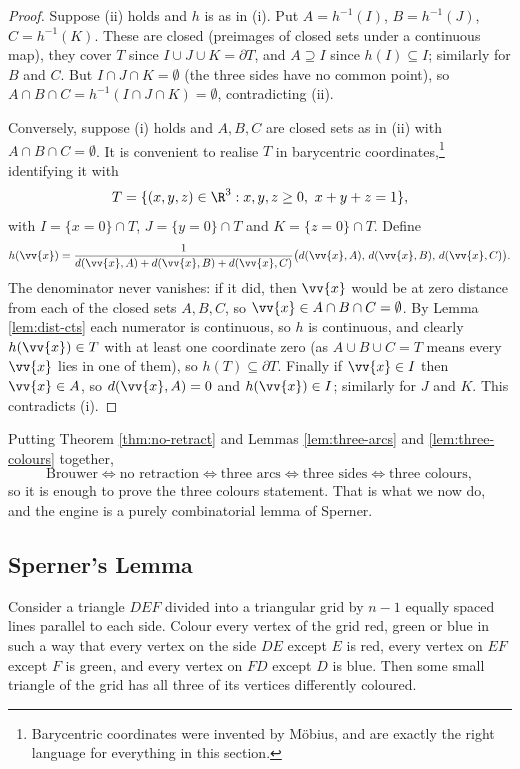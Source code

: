\begin{proof}
	Suppose (ii) holds and $h$ is as in (i). Put $A = h^{-1}(I)$, $B = h^{-1}(J)$, $C = h^{-1}(K)$. These are closed (preimages of closed sets under a continuous map), they cover $T$ since $I \cup J\cup K = \partial T$, and $A \supseteq I$ since $h(I)\subseteq I$; similarly for $B$ and $C$. But $I \cap J \cap K = \emptyset$ (the three sides have no common point), so $A\cap B\cap C = h^{-1}(I\cap J\cap K) = \emptyset$, contradicting (ii).

	Conversely, suppose (i) holds and $A,B,C$ are closed sets as in (ii) with $A\cap B\cap C = \emptyset$. It is convenient to realise $T$ in barycentric coordinates,\footnote{Barycentric coordinates were invented by M\"obius, and are exactly the right language for everything in this section.} identifying it with
	$$T = \{(x,y,z) \in \R^3 : x,y,z\geq 0,\ x+y+z = 1\},$$
	with $I = \{x = 0\}\cap T$, $J = \{y=0\}\cap T$ and $K = \{z=0\}\cap T$. Define
	$$h(\vv{x}) = \frac{1}{d(\vv{x},A)+d(\vv{x},B)+d(\vv{x},C)}\big(d(\vv{x},A),\, d(\vv{x},B),\, d(\vv{x},C)\big).$$
	The denominator never vanishes: if it did, then $\vv{x}$ would be at zero distance from each of the closed sets $A,B,C$, so $\vv{x} \in A\cap B\cap C = \emptyset$. By Lemma \ref{lem:dist-cts} each numerator is continuous, so $h$ is continuous, and clearly $h(\vv{x}) \in T$ with at least one coordinate zero (as $A\cup B\cup C = T$ means every $\vv{x}$ lies in one of them), so $h(T)\subseteq \partial T$. Finally if $\vv{x} \in I$ then $\vv{x}\in A$, so $d(\vv{x},A)=0$ and $h(\vv{x}) \in I$; similarly for $J$ and $K$. This contradicts (i).
\end{proof}

Putting Theorem \ref{thm:no-retract} and Lemmas \ref{lem:three-arcs} and \ref{lem:three-colours} together,
$$\text{Brouwer} \iff \text{no retraction} \iff \text{three arcs} \iff \text{three sides} \iff \text{three colours},$$
so it is enough to prove the three colours statement. That is what we now do, and the engine is a purely combinatorial lemma of Sperner.

\subsection{Sperner's Lemma}

\begin{lemma}[Sperner]\label{lem:sperner}
	Consider a triangle $DEF$ divided into a triangular grid by $n-1$ equally spaced lines parallel to each side. Colour every vertex of the grid red, green or blue in such a way that every vertex on the side $DE$ except $E$ is red, every vertex on $EF$ except $F$ is green, and every vertex on $FD$ except $D$ is blue. Then some small triangle of the grid has all three of its vertices differently coloured.
\end{lemma}

